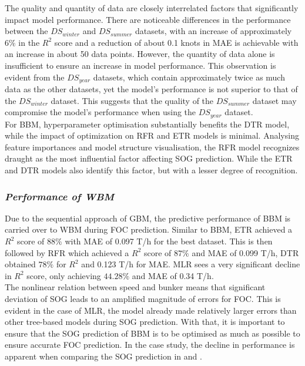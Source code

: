 The quality and quantity of data are closely interrelated factors that significantly impact model performance. There are noticeable differences in the performance between the $DS_{winter}$ and $DS_{summer}$ datasets, with an increase of approximately $6\%$ in the $R^2$ score and a reduction of about 0.1 knots in MAE is achievable with an increase in about 50 data points. However, the quantity of data alone is insufficient to ensure an increase in model performance. This observation is evident from the $DS_{year}$ datasets, which contain approximately twice as much data as the other datasets, yet the model's performance is not superior to that of the $DS_{winter}$ dataset. This suggests that the quality of the $DS_{summer}$ dataset may compromise the model's performance when using the $DS_{year}$ dataset.\\

For BBM, hyperparameter optimisation substantially benefits the DTR model, while the impact of optimization on RFR and ETR models is minimal. Analysing feature importances and model structure visualisation, the RFR model recognizes draught as the most influential factor affecting SOG prediction. While the ETR and DTR models also identify this factor, but with a lesser degree of recognition.\\

\subsubsection*{\emph{Performance of WBM}}


Due to the sequential approach of GBM, the predictive performance of BBM is carried over to WBM during FOC prediction. Similar to BBM, ETR achieved a $R^2$ score of $88\%$ with MAE of 0.097 T/h for the best dataset. This is then followed by RFR which achieved a $R^2$ score of $87\%$ and MAE of 0.099 T/h, DTR obtained $78\%$ for $R^2$ and 0.123 T/h for MAE. MLR sees a very significant decline in $R^2$ score, only achieving $44.28\%$ and MAE of 0.34 T/h.\\

The nonlinear relation between speed and bunker means that significant deviation of SOG leads to an amplified magnitude of errors for FOC. This is evident in the case of MLR, the model already made relatively larger errors than other tree-based models during SOG prediction. With that, it is important to ensure that the SOG prediction of BBM is to be optimised as much as possible to ensure accurate FOC prediction. In the case study, the decline in performance is apparent when comparing the SOG prediction in  and .\\

